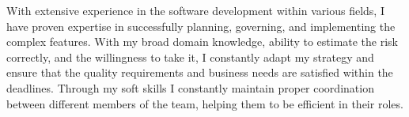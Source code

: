 

\begin{cvparagraph}

With extensive experience in the software development within various fields, I have proven expertise in successfully planning, governing, and implementing the complex features. With my broad domain knowledge, ability to estimate the risk correctly, and the willingness to take it, I constantly adapt my strategy and ensure that the quality requirements and business needs are satisfied within the deadlines. Through my soft skills I constantly maintain proper coordination between different members of the team, helping them to be efficient in their roles.
\end{cvparagraph}